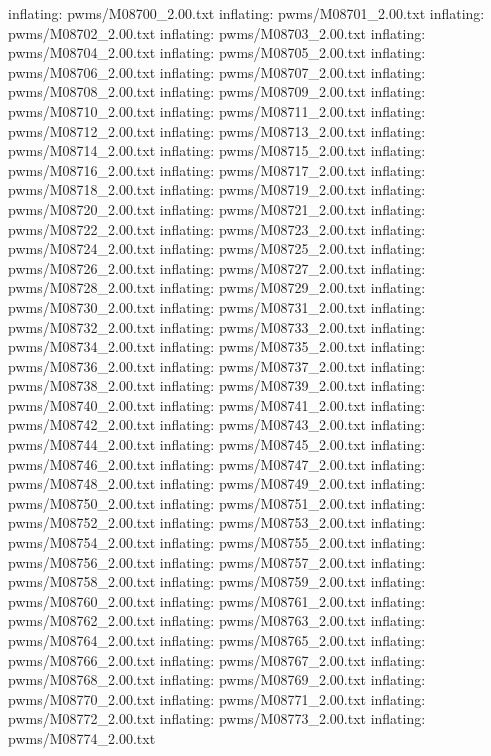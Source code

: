\documentclass[letterpaper,10pt,english]{sphinxmanual}
\begin{document}
{\begin{sphinxVerbatim}[commandchars=\\\{\}]
  inflating: pwms/M08700\_2.00.txt
  inflating: pwms/M08701\_2.00.txt
  inflating: pwms/M08702\_2.00.txt
  inflating: pwms/M08703\_2.00.txt
  inflating: pwms/M08704\_2.00.txt
  inflating: pwms/M08705\_2.00.txt
  inflating: pwms/M08706\_2.00.txt
  inflating: pwms/M08707\_2.00.txt
  inflating: pwms/M08708\_2.00.txt
  inflating: pwms/M08709\_2.00.txt
  inflating: pwms/M08710\_2.00.txt
  inflating: pwms/M08711\_2.00.txt
  inflating: pwms/M08712\_2.00.txt
  inflating: pwms/M08713\_2.00.txt
  inflating: pwms/M08714\_2.00.txt
  inflating: pwms/M08715\_2.00.txt
  inflating: pwms/M08716\_2.00.txt
  inflating: pwms/M08717\_2.00.txt
  inflating: pwms/M08718\_2.00.txt
  inflating: pwms/M08719\_2.00.txt
  inflating: pwms/M08720\_2.00.txt
  inflating: pwms/M08721\_2.00.txt
  inflating: pwms/M08722\_2.00.txt
  inflating: pwms/M08723\_2.00.txt
  inflating: pwms/M08724\_2.00.txt
  inflating: pwms/M08725\_2.00.txt
  inflating: pwms/M08726\_2.00.txt
  inflating: pwms/M08727\_2.00.txt
  inflating: pwms/M08728\_2.00.txt
  inflating: pwms/M08729\_2.00.txt
  inflating: pwms/M08730\_2.00.txt
  inflating: pwms/M08731\_2.00.txt
  inflating: pwms/M08732\_2.00.txt
  inflating: pwms/M08733\_2.00.txt
  inflating: pwms/M08734\_2.00.txt
  inflating: pwms/M08735\_2.00.txt
  inflating: pwms/M08736\_2.00.txt
  inflating: pwms/M08737\_2.00.txt
  inflating: pwms/M08738\_2.00.txt
  inflating: pwms/M08739\_2.00.txt
  inflating: pwms/M08740\_2.00.txt
  inflating: pwms/M08741\_2.00.txt
  inflating: pwms/M08742\_2.00.txt
  inflating: pwms/M08743\_2.00.txt
  inflating: pwms/M08744\_2.00.txt
  inflating: pwms/M08745\_2.00.txt
  inflating: pwms/M08746\_2.00.txt
  inflating: pwms/M08747\_2.00.txt
  inflating: pwms/M08748\_2.00.txt
  inflating: pwms/M08749\_2.00.txt
  inflating: pwms/M08750\_2.00.txt
  inflating: pwms/M08751\_2.00.txt
  inflating: pwms/M08752\_2.00.txt
  inflating: pwms/M08753\_2.00.txt
  inflating: pwms/M08754\_2.00.txt
  inflating: pwms/M08755\_2.00.txt
  inflating: pwms/M08756\_2.00.txt
  inflating: pwms/M08757\_2.00.txt
  inflating: pwms/M08758\_2.00.txt
  inflating: pwms/M08759\_2.00.txt
  inflating: pwms/M08760\_2.00.txt
  inflating: pwms/M08761\_2.00.txt
  inflating: pwms/M08762\_2.00.txt
  inflating: pwms/M08763\_2.00.txt
  inflating: pwms/M08764\_2.00.txt
  inflating: pwms/M08765\_2.00.txt
  inflating: pwms/M08766\_2.00.txt
  inflating: pwms/M08767\_2.00.txt
  inflating: pwms/M08768\_2.00.txt
  inflating: pwms/M08769\_2.00.txt
  inflating: pwms/M08770\_2.00.txt
  inflating: pwms/M08771\_2.00.txt
  inflating: pwms/M08772\_2.00.txt
  inflating: pwms/M08773\_2.00.txt
  inflating: pwms/M08774\_2.00.txt

\end{sphinxVerbatim}}
\end{document}
